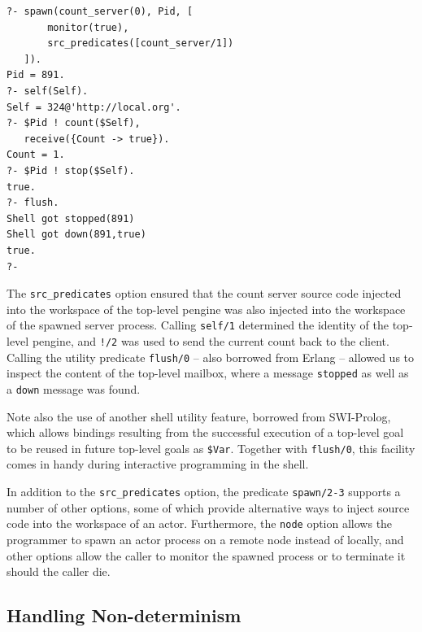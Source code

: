 \documentclass{tlp}
\begin{document}
\begin{lstlisting}
?- spawn(count_server(0), Pid, [
       monitor(true),
       src_predicates([count_server/1])
   ]).
Pid = 891.
?- self(Self).
Self = 324@'http://local.org'.
?- $Pid ! count($Self),
   receive({Count -> true}).
Count = 1.
?- $Pid ! stop($Self).
true.
?- flush.
Shell got stopped(891)
Shell got down(891,true)
true.
?-
\end{lstlisting}

\noindent The \texttt{src\_predicates} option ensured that the count server source code injected into the workspace of the top-level pengine was also injected into the workspace of the spawned server process. Calling \texttt{self/1} determined the identity of the top-level pengine, and \texttt{!/2} was used to send the current count back to the client. Calling the utility predicate \texttt{flush/0} -- also borrowed from Erlang -- allowed us to inspect the content of the top-level mailbox, where a message \texttt{stopped} as well as a \texttt{down} message was found. 

Note also the use of another shell utility feature, borrowed from SWI-Prolog, which allows bindings resulting from the successful execution of a top-level goal to be reused in future top-level goals as \texttt{\$Var}. Together with \texttt{flush/0}, this facility comes in handy during interactive programming in the shell.

In addition to the \texttt{src\_predicates} option, the predicate \texttt{spawn/2-3} supports a number of other options, some of which provide alternative ways to inject source code into the workspace of an actor. Furthermore, the \texttt{node} option allows the programmer to spawn an actor process on a remote node instead of locally, and other options allow the caller to monitor the spawned process or to terminate it should the caller die.


\subsection{Handling Non-determinism}\label{sec:non-det}
\end{document}
